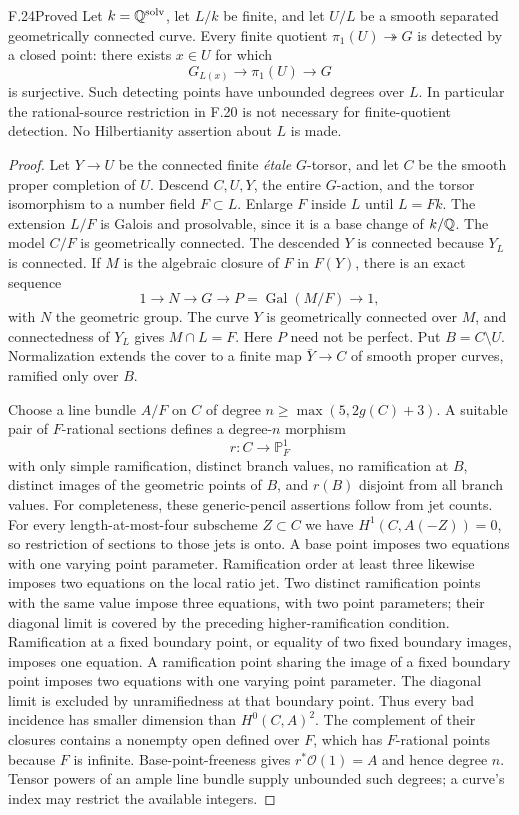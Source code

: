 \begin{claim}{F.24}{Proved}
Let $k=\mathbb Q^{\mathrm{solv}}$, let $L/k$ be finite, and let
$U/L$ be a smooth separated geometrically connected curve. Every finite
quotient $\pi_1(U)\twoheadrightarrow G$ is detected by a closed
point: there exists $x\in U$ for which
\[
 G_{L(x)}\longrightarrow\pi_1(U)\longrightarrow G
\]
is surjective. Such detecting points have unbounded degrees over
$L$. In particular the rational-source restriction in F.20 is
not necessary for finite-quotient detection. No Hilbertianity
assertion about $L$ is made.
\end{claim}
\begin{proof}
Let $Y\to U$ be the connected finite \emph{\'etale}
$G$-torsor, and let $C$ be the smooth proper completion of $U$.
Descend $C,U,Y$, the entire $G$-action, and the torsor
isomorphism to a number field $F\subset L$. Enlarge $F$ inside
$L$ until $L=Fk$. The extension $L/F$ is Galois and
prosolvable, since it is a base change of $k/\mathbb Q$.
The model $C/F$ is geometrically connected. The descended $Y$
is connected because $Y_L$ is connected. If $M$ is the
algebraic closure of $F$ in $F(Y)$, there is an exact sequence
\[
 1\longrightarrow N\longrightarrow G\longrightarrow
 P=\operatorname{Gal}(M/F)\longrightarrow1,
\]
with $N$ the geometric group. The curve $Y$ is geometrically
connected over $M$, and connectedness of $Y_L$ gives
$M\cap L=F$. Here $P$ need not be perfect. Put $B=C\setminus U$.
Normalization extends the cover to a finite map
$\bar Y\to C$ of smooth proper curves, ramified only over $B$.

Choose a line bundle $A/F$ on $C$ of degree
$n\ge\max(5,2g(C)+3)$. A suitable pair of $F$-rational
sections defines a degree-$n$ morphism
\[
 r:C\longrightarrow\mathbb P^1_F
\]
with only simple ramification, distinct branch values,
no ramification at $B$, distinct images of the geometric points of $B$,
and $r(B)$ disjoint from all branch values.
For completeness, these generic-pencil assertions follow from
jet counts. For every length-at-most-four subscheme $Z\subset C$
we have $H^1(C,A(-Z))=0$, so restriction of sections to those
jets is onto. A base point imposes two equations with one varying
point parameter. Ramification order at least three likewise
imposes two equations on the local ratio jet. Two distinct
ramification points with the same value impose three equations,
with two point parameters; their diagonal limit is covered by
the preceding higher-ramification condition. Ramification at a
fixed boundary point, or equality of two fixed boundary images,
imposes one equation. A ramification point sharing the image of
a fixed boundary point imposes two equations with one varying
point parameter. The diagonal limit is excluded by
unramifiedness at that boundary point. Thus every bad incidence
has smaller dimension than $H^0(C,A)^2$. The complement of
their closures contains a nonempty open defined over $F$,
which has $F$-rational points because $F$ is infinite.
Base-point-freeness gives $r^*\mathcal O(1)=A$ and hence degree
$n$. Tensor powers of an ample line bundle supply unbounded
such degrees; a curve's index may restrict the available integers.


\end{proof}
